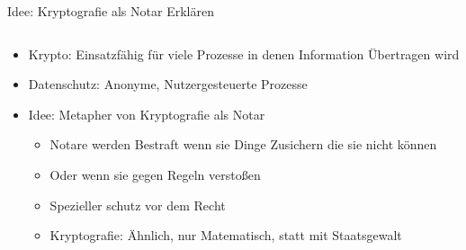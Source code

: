 \documentclass[german]{rosenpass-beamer}
\begin{document}
\begin{frame}{Idee: Kryptografie als Notar Erklären}
\begin{columns}[c]

\begin{column}{0.7\textwidth}
  \begin{itemize}
    \item Krypto: Einsatzfähig für viele Prozesse in denen Information Übertragen wird
    \item Datenschutz: Anonyme, Nutzergesteuerte Prozesse
    \item Idee: Metapher von Kryptografie als Notar
      \begin{itemize}
        \item Notare werden Bestraft wenn sie Dinge Zusichern die sie nicht können
        \item Oder wenn sie gegen Regeln verstoßen
        \item Spezieller schutz vor dem Recht
        \item Kryptografie: Ähnlich, nur Matematisch, statt mit Staatsgewalt
      \end{itemize}
  \end{itemize}
\end{column}


\end{columns}
\end{frame}
\end{document}
